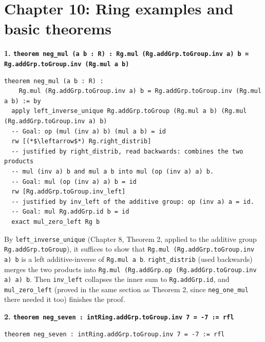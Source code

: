 \section{Chapter 10: Ring examples and basic theorems}\label{sec:15-appendix-solutions:09-chapter-10:1}

\textbf{1. \texttt{theorem neg\_\allowbreak{}mul (a b : R) : Rg.mul (Rg.addGrp.toGroup.inv a) b = Rg.addGrp.toGroup.inv (Rg.mul a b)}}

\begin{lstlisting}
theorem neg_mul (a b : R) :
    Rg.mul (Rg.addGrp.toGroup.inv a) b = Rg.addGrp.toGroup.inv (Rg.mul a b) := by
  apply left_inverse_unique Rg.addGrp.toGroup (Rg.mul a b) (Rg.mul (Rg.addGrp.toGroup.inv a) b)
  -- Goal: op (mul (inv a) b) (mul a b) = id
  rw [(*$\leftarrow$*) Rg.right_distrib]
  -- justified by right_distrib, read backwards: combines the two products
  -- mul (inv a) b and mul a b into mul (op (inv a) a) b.
  -- Goal: mul (op (inv a) a) b = id
  rw [Rg.addGrp.toGroup.inv_left]
  -- justified by inv_left of the additive group: op (inv a) a = id.
  -- Goal: mul Rg.addGrp.id b = id
  exact mul_zero_left Rg b
\end{lstlisting}

By \texttt{left\_\allowbreak{}inverse\_\allowbreak{}unique} (Chapter 8, Theorem 2, applied to the additive group \texttt{Rg.addGrp.toGroup}), it suffices to show that \texttt{Rg.mul (Rg.addGrp.toGroup.inv a) b} is a left additive-inverse of \texttt{Rg.mul a b}. \texttt{right\_\allowbreak{}distrib} (used backwards) merges the two products into \texttt{Rg.mul (Rg.addGrp.op (Rg.addGrp.toGroup.inv a) a) b}. Then \texttt{inv\_\allowbreak{}left} collapses the inner sum to \texttt{Rg.addGrp.id}, and \texttt{mul\_\allowbreak{}zero\_\allowbreak{}left} (proved in the same section as Theorem 2, since \texttt{neg\_\allowbreak{}one\_\allowbreak{}mul} there needed it too) finishes the proof.

\textbf{2. \texttt{theorem neg\_\allowbreak{}seven : intRing.addGrp.toGroup.inv 7 = -\allowbreak{}7 := rfl}}

\begin{lstlisting}
theorem neg_seven : intRing.addGrp.toGroup.inv 7 = -7 := rfl
\end{lstlisting}

